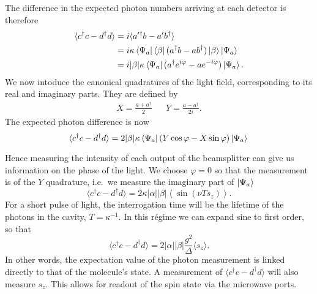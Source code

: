 The difference in the expected photon numbers arriving at each
detector is therefore
%
\begin{align}
  \langle c^\dagger c - d^\dagger d\rangle &= i\langle a'^\dagger b-
  a'b^\dagger \rangle \\
  &= i \kappa \bra{\Psi_a}\bra{\beta}(a^\dagger b-
  ab^\dagger)\ket{\beta}\ket{\Psi_a} \\
  & = i|\beta|\kappa \bra{\Psi_a}(a^\dagger e^{i\varphi} - a
  e^{-i\varphi})\ket{\Psi_a}.
\end{align}
%
We now intoduce the canonical quadratures of the light field, corresponding to
its real and imaginary parts. They are defined by~\cite{gerry_knight_2004}
%
\begin{align}
  X = \frac{a + a^\dagger}{2} && Y = \frac{a - a^\dagger}{2i}.
\end{align}
%
The expected photon difference is now
\begin{equation}
  \langle c^\dagger c - d^\dagger d\rangle =
  2|\beta|\kappa\bra{\Psi_a}(Y\cos\varphi - X\sin\varphi)\ket{\Psi_a} \\
  \label{squeeze:eqn:homoquads}
\end{equation}

Hence measuring the intensity of each output of the beamsplitter can give us
information on the phase of the light. We choose $\varphi = 0$ so that the
measurement is of the $Y$ quadrature, i.e.\ we measure the imaginary part of
$\ket{\Psi_a}$
%
\begin{equation}
  \langle c^\dagger c - d^\dagger d\rangle =  2\kappa
  |\alpha||\beta|\left\langle\sin(\nu T s_z)\right\rangle.
\end{equation}
%
For a short pulse of light, the interrogation time will be the lifetime of the
photons in the cavity, $T = \kappa^{-1}$. In this r\'egime we can expand sine
to first order, so that
%
\begin{equation}
  \langle c^\dagger c - d^\dagger d\rangle = 2|\alpha||\beta|
  \frac{g^2}{\Delta}\langle s_z\rangle.
  \label{mws:eqn:homomeas}
\end{equation}
%
In other words, the expectation value of the photon measurement is linked
directly to that of the molecule's state. A measurement of $\langle c^\dagger c
- d^\dagger d\rangle$ will also measure $s_z$. This allows for readout of the
spin state via the microwave ports.


